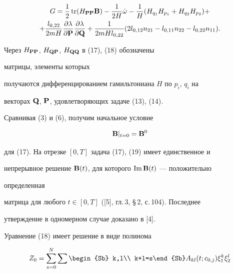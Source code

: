 \begin{multline*} 


G=\frac{1}{2}\tr(H_{\BP\BP}\BB)-\frac{1}{2H}\Dot\omega-\frac{1}{H} 


(H_{q_1}H_{p_1}+H_{q_2}H_{p_2})+\\ 


%


+\frac{l_{0,22}}{2mH}\frac{\partial\lambda}{\partial\BP} 


\frac{\partial\lambda}{\partial\BQ}+\frac{1}{2mHl_{0,22}} 


(2l_{0,12}n_{21}-l_{0,11}n_{22}-l_{0,22}n_{11}). 


\end{multline*} 


Через $H_{\bold P\bold P}$, $H_{\bold Q\bold P}$, $H_{\bold Q\bold Q}$ в (17), (18) обозначены 


матрицы, элементы которых 


получаются дифференцированием гамильтониана $H$ по $p_i$, $q_i$ на 


векторах $\bold Q$, $\bold P$, удовлетворяющих задаче (13), (14). 


 


Сравнивая (3) и (6), получим начальное условие 


\begin{equation} 


\BB|_{t=0}=\BB^0 


\end{equation} 


для (17). На отрезке $[0,T]$ задача (17), (19) имеет единственное и 


непрерывное решение $\bold B(t)$, для которого $\operatorname{Im}\bold B(t)$ --- положительно 


определенная 


матрица для любого $t\in[0,T]$ ([5], гл.\,3, \S\,2, с.\,104). Последнее 


утверждение в одномерном случае доказано в [4]. 


 


Уравнение (18) имеет решение в виде полинома 


\begin{equation} 


Z_0=\sum^N_{s=0}\sum\begin{Sb} k,l\\ k+l=s\end{Sb} 


A_{kl}(t;c_{0,j})\xi^k_1\xi^l_2 


\end{equation} 



